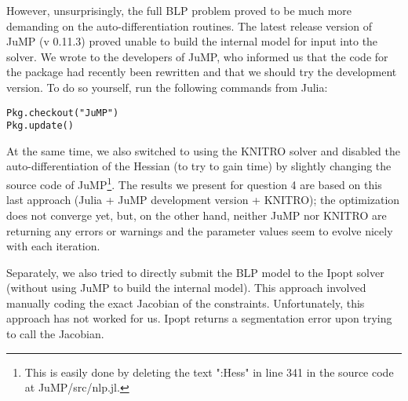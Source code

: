 \documentclass[a4paper,11pt]{article}
\begin{document}
However, unsurprisingly, the full BLP problem proved to be much more demanding on the auto-differentiation routines. The latest release version of JuMP (v 0.11.3) proved unable to build the internal model for input into the solver. We wrote to the developers of JuMP, who informed us that the code for the package had recently been rewritten and that we should try the development version. To do so yourself, run the following commands from Julia:
\begin{lstlisting}
Pkg.checkout("JuMP")
Pkg.update()
\end{lstlisting}
At the same time, we also switched to using the KNITRO solver and disabled the auto-differentiation of the Hessian (to try to gain time) by slightly changing the source code of JuMP\footnote{This is easily done by deleting the text ":Hess" in line 341 in the source code at JuMP/src/nlp.jl.}. The results we present for question 4 are based on this last approach (Julia + JuMP development version + KNITRO); the optimization does not converge yet, but, on the other hand, neither JuMP nor KNITRO are returning any errors or warnings and the parameter values seem to evolve nicely with each iteration. 

Separately, we also tried to directly submit the BLP model to the Ipopt solver (without using JuMP to build the internal model). This approach involved manually coding the exact Jacobian of the constraints. Unfortunately, this approach has not worked for us. Ipopt returns a  segmentation error upon trying to call the Jacobian.

\clearpage


\appendix
\end{document}
